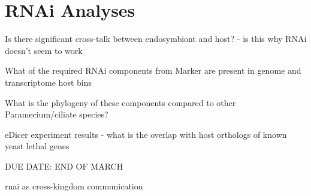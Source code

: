 \graphicspath{{chapters/7.Chapter_5/figures}}

\chapter{RNAi Analyses}

Is there significant cross-talk between endosymbiont and host? - is this why RNAi doesn't seem to work

What of the required RNAi components from Marker are present in genome and transcriptome host bins

What is the phylogeny of these components compared to other Paramecium/ciliate species?

eDicer experiment results - what is the overlap with host orthologs of known yeast lethal genes

DUE DATE: END OF MARCH


rnai as cross-kingdom communication \citep{Weiberg2015}
